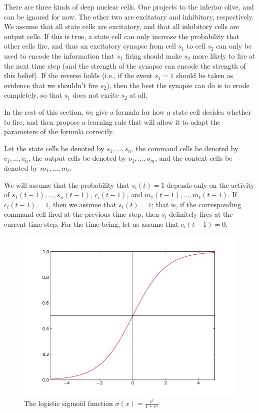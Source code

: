 \documentclass{article}
\theoremstyle{definition}
\begin{document}
There are three kinds of deep nuclear cells. One projects to the
inferior olive, and can be ignored for now. The other two are
excitatory and inhibitory, respectively. We assume that all state
cells are excitatory, and that all inhibitory cells are output
cells. If this is true, a state cell can only increase the probability
that other cells fire, and thus an excitatory synapse from cell $s_1$
to cell $s_2$ can only be used to encode the information that $s_1$
firing should make $s_2$ more likely to fire at the next time step
(and the strength of the synapse can encode the strength of this
belief). If the reverse holds (i.e., if the event $s_1=1$ should be
taken as evidence that we shouldn't fire $s_2$), then the best the
synapse can do is to erode completely, so that $s_1$ does not excite
$s_2$ at all.

In the rest of this section, we give a formula for how a state cell
decides whether to fire, and then propose a learning rule that will
allow it to adapt the parameters of the formula correctly.

Let the state cells be denoted by $s_1, \dots, s_n$, the command cells
be denoted by $c_1, \dots, c_n$, the output cells be denoted by $o_1,
\dots, o_m$, and the context cells be denoted by $m_1, \dots, m_\ell$.

We will assume that the probability that $s_i(t)=1$ depends only on
the activity of $s_1(t-1), \dots, s_n(t-1)$, $c_i(t-1)$, and
$m_1(t-1), \dots, m_\ell(t-1)$. If $c_i(t-1)=1$, then we assume that
$s_i(t)=1$; that is, if the corresponding command cell fired at the
previous time step, then $s_i$ definitely fires at the current time
step. For the time being, let us assume that $c_i(t-1)=0$.

\begin{figure}
\includegraphics[width=0.5 \linewidth]{sigmoid.png}
\caption{The logistic sigmoid function $\sigma(x) = \frac{e^x}{1 +
    e^x}$}
\label{fig-sigmoid}
\end{figure}
\end{document}
